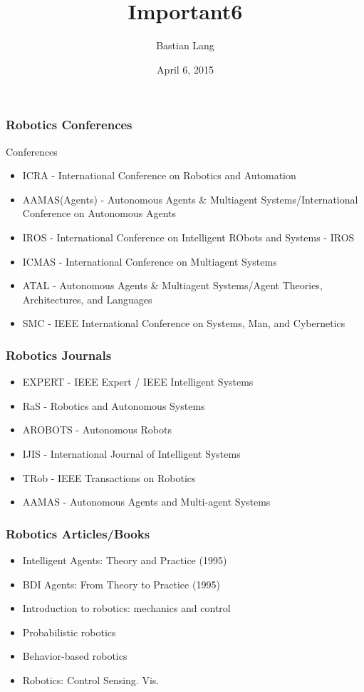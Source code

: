 \documentclass[8pt]{beamer}
\title[Important6]{Important6} %
\author{Bastian Lang} %
\institute[BRSU] %
{
Master of Autonomous Systems \\ %
}
\date{April 6, 2015}
\begin{document}
\listoffigures
\begin{frame}
\titlepage 
\end{frame}

\begin{frame}
\frametitle{Robotics Conferences}
Conferences
\begin{itemize}
\item ICRA - International Conference on Robotics and Automation
\item AAMAS(Agents) - Autonomous Agents \& Multiagent Systems/International Conference on Autonomous Agents
\item IROS - International Conference on Intelligent RObots and Systems - IROS
\item ICMAS - International Conference on Multiagent Systems
\item ATAL - Autonomous Agents \& Multiagent Systems/Agent Theories, Architectures, and Languages
\item SMC - IEEE International Conference on Systems, Man, and Cybernetics
\end{itemize}
\end{frame}

\begin{frame}
\frametitle{Robotics Journals}
\begin{itemize}
\item EXPERT - IEEE Expert / IEEE Intelligent Systems
\item RaS - Robotics and Autonomous Systems
\item AROBOTS - Autonomous Robots
\item IJIS - International Journal of Intelligent Systems
\item TRob - IEEE Transactions on Robotics
\item AAMAS - Autonomous Agents and Multi-agent Systems
\end{itemize}
\end{frame}

\begin{frame}
\frametitle{Robotics Articles/Books}
\begin{itemize}
\item Intelligent Agents: Theory and Practice (1995)
\item BDI Agents: From Theory to Practice (1995)
\item Introduction to robotics: mechanics and control
\item Probabilistic robotics
\item Behavior-based robotics
\item Robotics: Control Sensing. Vis.
\end{itemize}
\end{frame}
\end{document}
